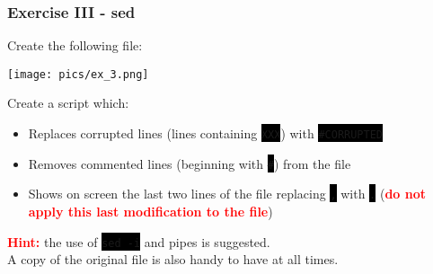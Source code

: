 \documentclass[unknownkeysallowed, 10pt, a4 paper, handout]{beamer}
\newcommand{\focus}[1]{\textbf{\textcolor{red}{#1}}}
\newcommand{\code}[1]{\colorbox{black}{\color{green}\texttt{#1}}}
\newcommand{\sidebyside}[5]{
  \begin{minipage}{#1\textwidth}
    #2
  \end{minipage} #3 \begin{minipage}{#4\textwidth}
    #5
  \end{minipage}
}
\begin{document}
\begin{frame}
  \begin{center}
    \frametitle{Exercise III - sed}

    \sidebyside{0.35}{
      Create the following file:
    }{\hfill}{0.60}{
      \begin{center}
        \texttt{[image: pics/ex\_3.png]}
      \end{center}
    }

    \vspace{2mm}

    Create a script which:

    \begin{itemize}
      \item Replaces corrupted lines (lines containing \code{XXX}) with
        \code{\#CORRUPTED}
      \item Removes commented lines (beginning with \code{\#}) from the file
      \item Shows on screen the last two lines of the file replacing \code{,}
        with \code{.} (\focus{do not apply this last modification to the file})
    \end{itemize}

    \vspace{2mm}

    \focus{Hint:} the use of \code{sed -i} and pipes is suggested.\\
    A copy of the original file is also handy to have at all times.
  \end{center}
\end{frame}
\end{document}
